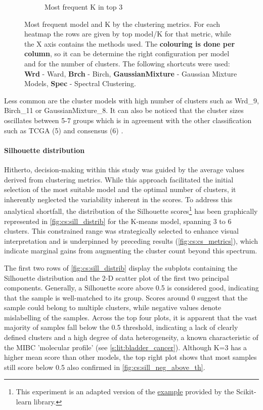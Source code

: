 \begin{figure}[!htb]
\begin{subfigure}[!t]{0.65\textwidth}
        \caption{Most frequent K in top 3}
        \label{fig:cs:heatmap_cs}
    \end{subfigure}
    \caption{Most frequent model and K by the clustering metrics. For each heatmap the rows are given by top model/K for that metric, while the X axis contains the methods used. The \textbf{colouring is done per column}, so it can be determine the right configuration per model and for the number of clusters. The following shortcuts were used: \textbf{Wrd} - Ward, \textbf{Brch} - Birch, \textbf{GaussianMixture} - Gaussian Mixture Models, \textbf{Spec} - Spectral Clustering.}
    \label{fig:cs:cs_metrics_heatmap}
\end{figure}


Less common are the cluster models with high number of clusters such as Wrd\_9, Birch\_11 or GaussianMixture\_8. It can also be noticed that the cluster sizes oscillates between 5-7 groups which is in agreement with the other classification such as TCGA (5) and consensus (6) \citet{Robertson2017-mg,Kamoun2020-tj}.


\paragraph*{Silhouette distribution}

Hitherto, decision-making within this study was guided by the average values derived from clustering metrics. While this approach facilitated the initial selection of the most suitable model and the optimal number of clusters, it inherently neglected the variability inherent in the scores. To address this analytical shortfall, the distribution of the Silhouette scores\footnote{This experiment is an adapted version of the \href{https://tinyurl.com/sillhouete-distrib}{example} provided by the Scikit-learn library.} has been graphically represented in \cref{fig:cs:sill_distrib} for the K-means model, spanning 3 to 6 clusters. This constrained range was strategically selected to enhance visual interpretation and is underpinned by preceding results (\cref{fig:cs:cs_metrics}), which indicate marginal gains from augmenting the cluster count beyond this spectrum.


The first two rows of \cref{fig:cs:sill_distrib} display the subplots containing the Silhouette distribution and the 2-D scatter plot of the first two principal components. Generally, a Silhouette score above 0.5 is considered good, indicating that the sample is well-matched to its group. Scores around 0 suggest that the sample could belong to multiple clusters, while negative values denote mislabelling of the samples. Across the top four plots, it is apparent that the vast majority of samples fall below the 0.5 threshold, indicating a lack of clearly defined clusters and a high degree of data heterogeneity, a known characteristic of the MIBC 'molecular profile' (see \cref{s:lit:bladder_cancer}). Although K=3 has a higher mean score than other models, the top right plot shows that most samples still score below 0.5 also confirmed in \cref{fig:cs:sill_neg_above_th}.


